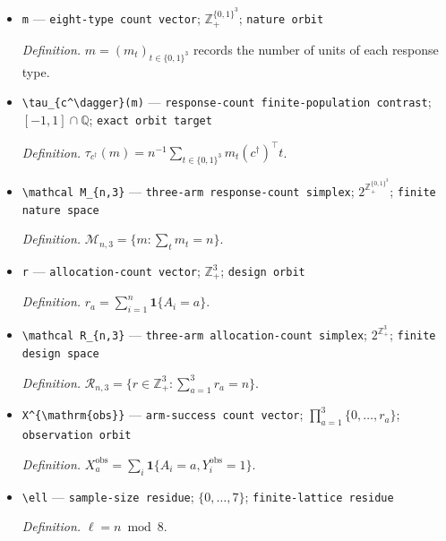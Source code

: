 \documentclass{article}
\begin{document}
\begin{itemize}
  \item \texttt{m} --- \texttt{eight-\allowbreak{}type count vector}; \(\mathbb Z_+^{\{0,1\}^3}\); \texttt{nature orbit}
  \par\smallskip\noindent\emph{Definition.} \(m=(m_t)_{t\in\{0,1\}^3}\) records the number of units of each response type.
  \item \texttt{\textbackslash{}\allowbreak{}tau\_\allowbreak{}\{c\textasciicircum{}\textbackslash{}\allowbreak{}dagger\}\allowbreak{}(m)} --- \texttt{response-\allowbreak{}count finite-\allowbreak{}population contrast}; \([-1,1]\cap\mathbb Q\); \texttt{exact orbit target}
  \par\smallskip\noindent\emph{Definition.} \(\tau_{c^\dagger}(m)=n^{-1}\sum_{t\in\{0,1\}^3}m_t(c^\dagger)^\top t\).
  \item \texttt{\textbackslash{}\allowbreak{}mathcal M\_\allowbreak{}\{n,\allowbreak{}3\}\allowbreak{}} --- \texttt{three-\allowbreak{}arm response-\allowbreak{}count simplex}; \(2^{\mathbb Z_+^{\{0,1\}^3}}\); \texttt{finite nature space}
  \par\smallskip\noindent\emph{Definition.} \(\mathcal M_{n,3}=\{m:\sum_tm_t=n\}\).
  \item \texttt{r} --- \texttt{allocation-\allowbreak{}count vector}; \(\mathbb Z_+^3\); \texttt{design orbit}
  \par\smallskip\noindent\emph{Definition.} \(r_a=\sum_{i=1}^n\mathbf 1\{A_i=a\}\).
  \item \texttt{\textbackslash{}\allowbreak{}mathcal R\_\allowbreak{}\{n,\allowbreak{}3\}\allowbreak{}} --- \texttt{three-\allowbreak{}arm allocation-\allowbreak{}count simplex}; \(2^{\mathbb Z_+^3}\); \texttt{finite design space}
  \par\smallskip\noindent\emph{Definition.} \(\mathcal R_{n,3}=\{r\in\mathbb Z_+^3:\sum_{a=1}^3r_a=n\}\).
  \item \texttt{X\textasciicircum{}\{\textbackslash{}\allowbreak{}mathrm\{obs\}\allowbreak{}\}\allowbreak{}} --- \texttt{arm-\allowbreak{}success count vector}; \(\prod_{a=1}^3\{0,\ldots,r_a\}\); \texttt{observation orbit}
  \par\smallskip\noindent\emph{Definition.} \(X_a^{\mathrm{obs}}=\sum_i\mathbf 1\{A_i=a,Y_i^{\mathrm{obs}}=1\}\).
  \item \texttt{\textbackslash{}\allowbreak{}ell} --- \texttt{sample-\allowbreak{}size residue}; \(\{0,\ldots,7\}\); \texttt{finite-\allowbreak{}lattice residue}
  \par\smallskip\noindent\emph{Definition.} \(\ell=n\bmod 8\).

\end{itemize}
\end{document}
